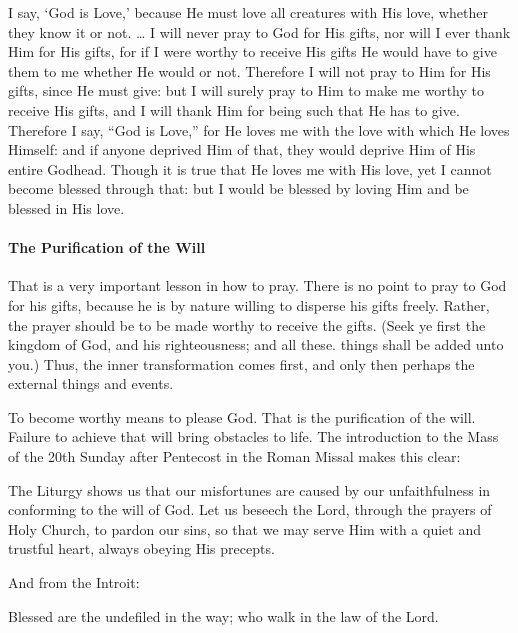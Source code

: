 \begin{quotex}
I say, `God is Love,' because He must love all creatures with His love, whether they know it or not. … I will never pray to God for His gifts, nor will I ever thank Him for His gifts, for if I were worthy to receive His gifts He would have to give them to me whether He would or not. Therefore I will not pray to Him for His gifts, since He must give: but I will surely pray to Him to make me worthy to receive His gifts, and I will thank Him for being such that He has to give. Therefore I say, “God is Love,” for He loves me with the love with which He loves Himself: and if anyone deprived Him of that, they would deprive Him of His entire Godhead. Though it is true that He loves me with His love, yet I cannot become blessed through that: but I would be blessed by loving Him and be blessed in His love. 

\end{quotex}
\paragraph{The Purification of the Will}
That is a very important lesson in how to pray. There is no point to pray to God for his gifts, because he is by nature willing to disperse his gifts freely. Rather, the prayer should be to be made worthy to receive the gifts. (Seek ye first the kingdom of God, and his righteousness; and all these. things shall be added unto you.) Thus, the inner transformation comes first, and only then perhaps the external things and events.

To become worthy means to please God. That is the purification of the will. Failure to achieve that will bring obstacles to life. The introduction to the Mass of the 20th Sunday after Pentecost in the Roman Missal makes this clear:

\begin{quotex}
The Liturgy shows us that our misfortunes are caused by our unfaithfulness in conforming to the will of God. Let us beseech the Lord, through the prayers of Holy Church, to pardon our sins, so that we may serve Him with a quiet and trustful heart, always obeying His precepts. 

\end{quotex}
And from the Introit:

\begin{quotex}
Blessed are the undefiled in the way; who walk in the law of the Lord. 

\end{quotex}
